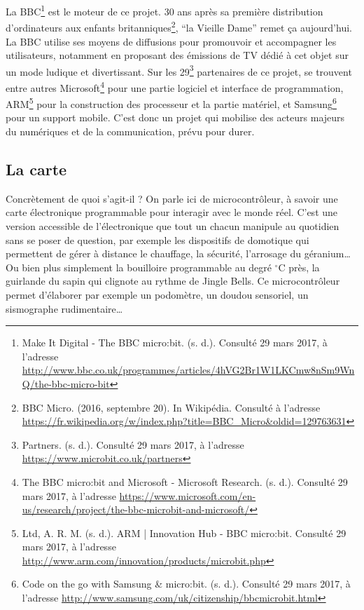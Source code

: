 La BBC\footnote{Make It Digital - The BBC micro:bit. (s. d.). Consulté 29 mars 2017, à l’adresse \url{http://www.bbc.co.uk/programmes/articles/4hVG2Br1W1LKCmw8nSm9WnQ/the-bbc-micro-bit}} est le moteur de ce projet. 30 ans après sa première distribution d’ordinateurs aux enfants britanniques\footnote{BBC Micro. (2016, septembre 20). In Wikipédia. Consulté à l’adresse \url{https://fr.wikipedia.org/w/index.php?title=BBC_Micro&oldid=129763631}}, “la Vieille Dame” remet ça aujourd’hui. La BBC utilise ses moyens de diffusions pour promouvoir et accompagner les utilisateurs, notamment en proposant des émissions de TV dédié à cet objet sur un mode ludique et divertissant. Sur les 29\footnote{Partners. (s. d.). Consulté 29 mars 2017, à l’adresse \url{https://www.microbit.co.uk/partners}} partenaires de ce projet, se trouvent entre autres Microsoft\footnote{The BBC micro:bit and Microsoft - Microsoft Research. (s. d.). Consulté 29 mars 2017, à l’adresse \url{https://www.microsoft.com/en-us/research/project/the-bbc-microbit-and-microsoft/}} pour une partie logiciel et interface de programmation, ARM\footnote{Ltd, A. R. M. (s. d.). ARM | Innovation Hub - BBC micro:bit. Consulté 29 mars 2017, à l’adresse \url{http://www.arm.com/innovation/products/microbit.php}} pour la construction des processeur et la partie matériel, et Samsung\footnote{Code on the go with Samsung \& micro:bit. (s. d.). Consulté 29 mars 2017, à l’adresse \url{http://www.samsung.com/uk/citizenship/bbcmicrobit.html}} pour un support mobile. C’est donc un projet qui mobilise des acteurs majeurs du numériques et de la communication, prévu pour durer.



\subsection{La carte \mb}

Concrètement de quoi s’agit-il ? On parle ici de microcontrôleur, à savoir une carte électronique programmable pour interagir avec le monde réel.
C’est une version accessible de l’électronique que tout un chacun manipule au quotidien sans se poser de question, par exemple les dispositifs de domotique qui permettent de gérer à distance le chauffage, la sécurité, l’arrosage du géranium… Ou bien plus simplement la bouilloire programmable au degré ${}^{\circ}$C près, la guirlande du sapin qui clignote au rythme de Jingle Bells. 
Ce microcontrôleur permet d’élaborer par exemple un podomètre, un doudou sensoriel, un sismographe rudimentaire\ldots

